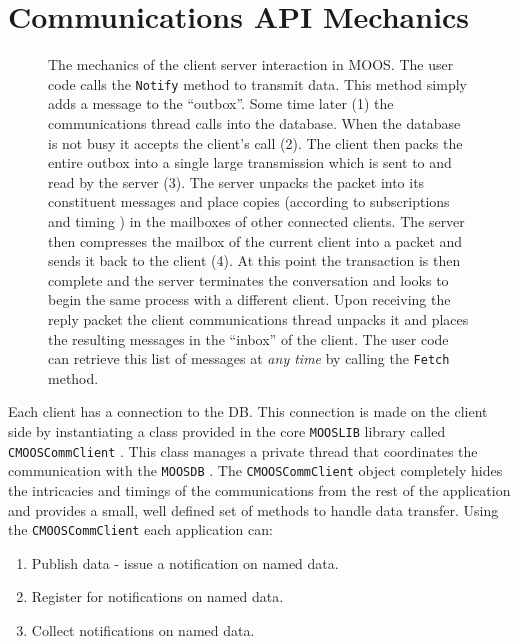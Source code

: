 \documentclass[a4paper,10pt]{article}
\newcommand{\Code}[1]{\texttt{#1} }
\newcommand{\code}[1]{\Code{#1} }
\newcommand{\DB}   {\code{{MOOSDB}}}
\begin{document}
\section{Communications API Mechanics}
\begin{figure*}[ht!]
\centering {}
\caption{The mechanics of the client server interaction in MOOS.
The user code calls the \code{Notify} method to transmit data.
This method simply adds a message to the ``outbox''. Some time
later (1) the communications thread calls into the database. When
the database is not busy it accepts the client's call (2). The
client then packs the entire outbox into a single large
transmission which is sent to and read by the server (3). The
server unpacks the packet into its constituent messages and place
copies (according to subscriptions and timing ) in the mailboxes
of other connected clients. The server then compresses the mailbox
of the current client into a packet and sends it back to the
client (4). At this point the transaction is then complete and the
server terminates the conversation and looks to begin the same
process with a different client. Upon receiving the reply packet
the client communications thread unpacks it and places the
resulting messages in the ``inbox'' of the client. The user code
can retrieve this list of messages at {\it{any time}} by calling
the \code{Fetch} method.}
\end{figure*}

Each client has a connection to the DB. This connection is made on
the client side by instantiating a class provided in the core
\code{MOOSLIB} library called \code{CMOOSCommClient}. This class
manages a private thread that coordinates the communication with
the \DB. The \code{CMOOSCommClient} object completely hides the
intricacies and timings of the communications from the rest of the
application and provides a small, well defined set of methods to
handle data transfer. Using the \code{CMOOSCommClient} each
application can:
\begin{enumerate}
\item Publish data - issue a notification on named data.
\item Register for notifications on named data.
\item Collect notifications on named  data.
\end{enumerate}
\end{document}

